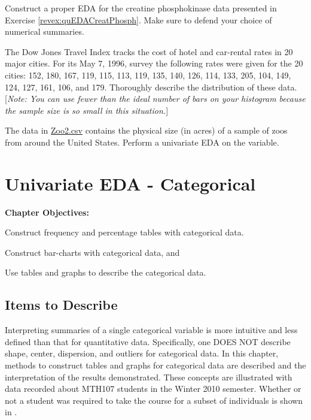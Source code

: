 \documentclass[10pt,openany]{book}\usepackage[]{graphicx}\usepackage[]{color}
\begin{document}
\begin{exsection}
  \item \label{revex:quEDACP} \rhw{} Construct a proper EDA for the creatine phosphokinase data presented in Exercise \ref{revex:quEDACreatPhosph}.  Make sure to defend your choice of numerical summaries.  
  \item \label{revex:quEDADJTI} \rhw{} \hspace{12pt} The Dow Jones Travel Index tracks the cost of hotel and car-rental rates in 20 major cities.  For its May 7, 1996, survey the following rates were given for the 20 cities: 152, 180, 167, 119, 115, 113, 119, 135, 140, 126, 114, 133, 205, 104, 149, 124, 127, 161, 106, and 179.  Thoroughly describe the distribution of these data.  [\textit{Note: You can use fewer than the ideal number of bars on your histogram because the sample size is so small in this situation.}] 
  \item \label{revex:quEDAZoo2} \rhw{} The data in \href{https://raw.githubusercontent.com/droglenc/NCData/master/Zoo2.csv}{Zoo2.csv} contains the physical size (in acres) of a sample of zoos from around the United States.  Perform a univariate EDA on the  variable. 
\end{exsection}



\chapter{Univariate EDA - Categorical} \label{chap:UnivEDACat}
\begin{ChapObj}{\boxwidth}
  \textbf{Chapter Objectives:}
  \begin{Enumerate}
    \item Construct frequency and percentage tables with categorical data.
    \item Construct bar-charts with categorical data, and
    \item Use tables and graphs to describe the categorical data.
  \end{Enumerate}
\end{ChapObj}

\minitoc
\newpage

\section{Items to Describe}
Interpreting summaries of a single categorical variable is more intuitive and less defined than that for quantitative data.  Specifically, one DOES NOT describe shape, center, dispersion, and outliers for categorical data.  In this chapter, methods to construct tables and graphs for categorical data are described and the interpretation of the results demonstrated.  These concepts are illustrated with data recorded about MTH107 students in the Winter 2010 semester.  Whether or not a student was required to take the course for a subset of individuals is shown in .
\end{document}

